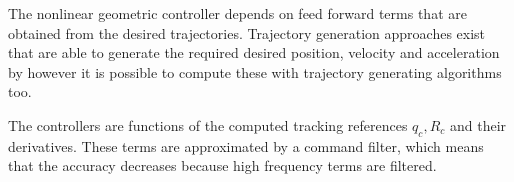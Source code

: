 The nonlinear geometric controller depends on feed forward terms that are obtained from the desired trajectories. 
Trajectory generation approaches exist that are able to generate the required desired position, velocity and acceleration by 
however it is possible to compute these with trajectory generating algorithms too.

The controllers are functions of the computed tracking references $ q_c, R_c $ and their derivatives. These terms are approximated by a command filter, which means that the accuracy decreases because high frequency terms are filtered.







